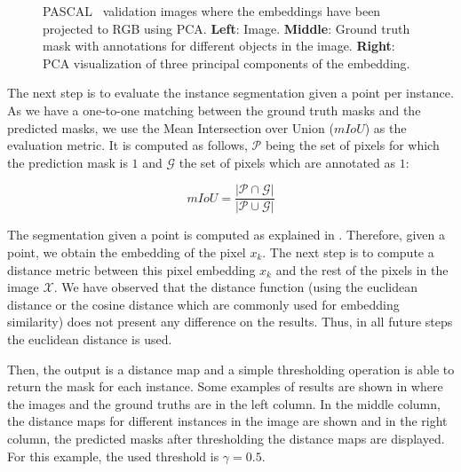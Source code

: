 \begin{figure}[h]
  \centering
  \caption{PASCAL~\pascal{} validation images where the embeddings have been projected to RGB using PCA.
    \textbf{Left}: Image.
    \textbf{Middle}: Ground truth mask with annotations for different objects in the image.
    \textbf{Right}: PCA visualization of three principal components of the embedding.
  }
  \label{fig:experiments:segmentation:pca}
\end{figure}

The next step is to evaluate the instance segmentation given a point per instance.
As we have a one-to-one matching between the ground truth masks and the predicted masks, we use the Mean Intersection over Union ($mIoU$) as the evaluation metric.
It is computed as follows, $\mathcal{P}$ being the set of pixels for which the prediction mask is $1$ and $\mathcal{G}$ the set of pixels which are annotated as $1$:

\begin{equation}
  mIoU = \frac{|\mathcal{P} \cap \mathcal{G}|}{|\mathcal{P} \cup \mathcal{G}|}
\end{equation}

The segmentation given a point is computed as explained in .
Therefore, given a point, we obtain the embedding of the pixel $x_k$.
The next step is to compute a distance metric between this pixel embedding $x_k$ and the rest of the pixels in the image $\mathcal{X}$.
We have observed that the distance function (using the euclidean distance or the cosine distance which are commonly used for embedding similarity) does not present any difference on the results.
Thus, in all future steps the euclidean distance is used.

Then, the output is a distance map and a simple thresholding operation is able to return the mask for each instance.
Some examples of results are shown in  where the images and the ground truths are in the left column.
In the middle column, the distance maps for different instances in the image are shown and in the right column, the predicted masks after thresholding the distance maps are displayed.
For this example, the used threshold is $\gamma = 0.5$.

